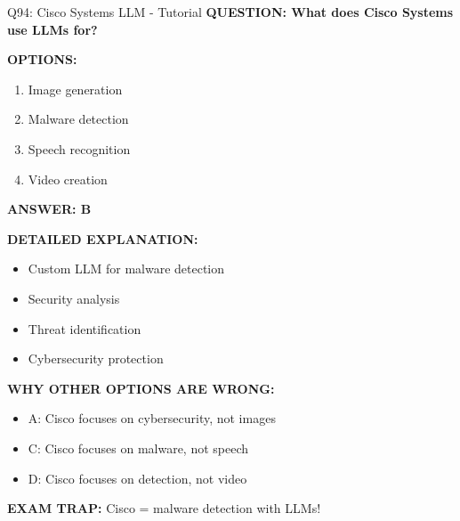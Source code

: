 \documentclass[8pt]{beamer}
\begin{document}
	\begin{frame}{Q94: Cisco Systems LLM - Tutorial}
		\fontsize{6.5}{7.5}\selectfont
		\textbf{QUESTION: What does Cisco Systems use LLMs for?}
		
		\vspace{0.1cm}
		\textbf{OPTIONS:}
		\begin{enumerate}
			\item Image generation
			\item Malware detection
			\item Speech recognition
			\item Video creation
		\end{enumerate}
		
		\vspace{0.1cm}
		\textcolor{myblue}{\textbf{ANSWER: B}}
		
		\vspace{0.1cm}
		\textbf{DETAILED EXPLANATION:}
		\begin{itemize}
			\item Custom LLM for malware detection
			\item Security analysis
			\item Threat identification
			\item Cybersecurity protection
		\end{itemize}
		
		\vspace{0.1cm}
		\textcolor{myred}{\textbf{WHY OTHER OPTIONS ARE WRONG:}}
		\begin{itemize}
			\item \textcolor{myred}{A:} Cisco focuses on cybersecurity, not images
			\item \textcolor{myred}{C:} Cisco focuses on malware, not speech
			\item \textcolor{myred}{D:} Cisco focuses on detection, not video
		\end{itemize}
		
		\textcolor{myred}{\textbf{EXAM TRAP:}} Cisco = \textcolor{myblue}{malware detection} with LLMs!
	\end{frame}
	
\end{document}
